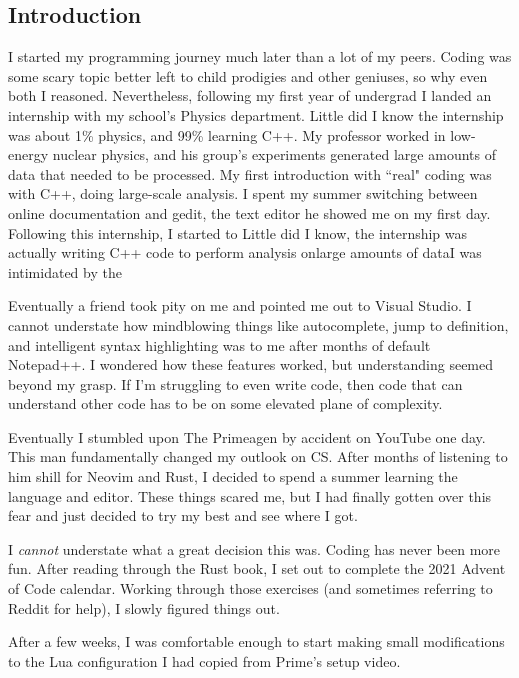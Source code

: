 \subsection{Introduction}

I started my programming journey much later than a lot of my peers.
Coding was some scary topic better left to child prodigies and other geniuses, so why even both I reasoned. 
Nevertheless, following my first year of undergrad I landed an internship with my school's Physics department.
Little did I know the internship was about 1\% physics, and 99\% learning C++. My professor worked in low-energy nuclear physics, and his group's experiments generated large amounts of data that needed to be processed.
My first introduction with ``real" coding was with C++, doing large-scale analysis. I spent my summer switching between online documentation and gedit,
the text editor he showed me on my first day. Following this internship, I started to 
Little did I know, the internship was actually writing C++ code to perform analysis onlarge amounts of dataI was intimidated by the 

Eventually a friend took pity on me and pointed me out to Visual Studio. I cannot understate how mindblowing things like autocomplete, jump to definition, and intelligent syntax highlighting was to me after months of default Notepad++.
I wondered how these features worked, but understanding seemed beyond my grasp. If I'm struggling to even write code, then code that can understand other code has to be on some elevated plane of complexity.

Eventually I stumbled upon The Primeagen by accident on YouTube one day. This man fundamentally changed my outlook on CS. 
After months of listening to him shill for Neovim and Rust, I decided to spend a summer learning the language and editor.
These things scared me, but I had finally gotten over this fear and just decided to try my best and see where I got. 

I \textit{cannot} understate what a great decision this was. Coding has never been more fun. 
After reading through the Rust book, I set out to complete the 2021 Advent of Code calendar. 
Working through those exercises (and sometimes referring to Reddit for help), I slowly figured things out.

After a few weeks, I was comfortable enough to start making small modifications to the Lua configuration
I had copied from Prime's setup video. 


